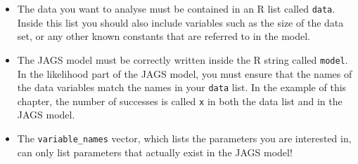 \begin{itemize}
\item The data you want to analyse must be contained in an R
list called {\tt data}. Inside this list you should also include variables
such as the size of the data set, or any other known constants that are
referred to in the model.
\item The JAGS model must be correctly written inside the R string called
{\tt model}. In the likelihood part of the JAGS model, you must ensure that
the names of the data variables match the names in your {\tt data} list. In
the example of this chapter, the number of successes is called {\tt x} in both
the data list and in the JAGS model.
\item The {\tt variable\_names} vector, which lists the parameters you are
interested in, can only list parameters that actually exist in the JAGS model!
\end{itemize}
